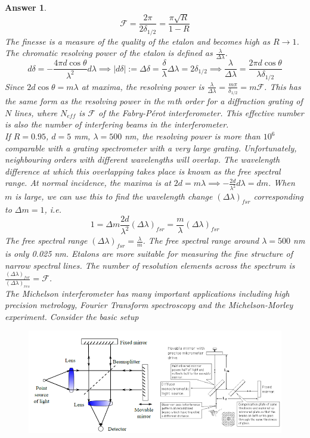 \documentclass[a4paper]{article}
\newtheorem{ans}{Answer}[subsection]
\theoremstyle{new}
\begin{document}
\begin{ans}
$$\mathcal{F}=\frac{2\pi}{2\delta_{1/2}}=\frac{\pi\sqrt{R}}{1-R}$$
The finesse is a measure of the quality of the etalon and becomes high as $R\rightarrow 1$. The chromatic resolving power of the etalon is defined as $\frac{\lambda}{\Delta\lambda}$.
$$d\delta=-\frac{4\pi d\cos\theta}{\lambda^2}d\lambda\implies|d\delta|:=\Delta\delta=\frac{\delta}{\lambda}\Delta\lambda=2\delta_{1/2}\implies\frac{\lambda}{\Delta\lambda}=\frac{2\pi d\cos\theta}{\lambda\delta_{1/2}}$$
Since $2d\cos\theta=m\lambda$ at maxima, the resolving power is $\frac{\lambda}{\Delta\lambda}=\frac{m\pi}{\delta_{1/2}}=m\mathcal{F}$. This has the same form as the resolving power in the $m$th order for a diffraction grating of $N$ lines, where $N_{eff}$ is $\mathcal{F}$ of the Fabry-Pérot interferometer. This effective number is also the number of interfering beams in the interferometer.\\[5pt]
If $R=0.95$, $d=5$ mm, $\lambda=500$ nm, the resolving power is more than $10^6$ comparable with a grating spectrometer with a very large grating. Unfortunately, neighbouring orders with different wavelengths will overlap. The wavelength difference at which this  overlapping takes place is known as the free spectral range. At normal incidence, the maxima is at $2d=m\lambda\implies-\frac{2d}{\lambda^2}d\lambda=dm$. When $m$ is large, we can use this to find the wavelength change $(\Delta\lambda)_{fsr}$ corresponding to $\Delta m=1$, i.e.
$$1=\Delta m\frac{2d}{\lambda^2}(\Delta\lambda)_{fsr}=\frac{m}{\lambda}(\Delta\lambda)_{fsr}$$
The free spectral range $(\Delta\lambda)_{fsr}=\frac{\lambda}{m}$. The free spectral range around $\lambda=500$ nm is only 0.025 nm. Etalons are more suitable for measuring the fine structure of narrow spectral lines. The number of resolution elements across the spectrum is $\frac{(\Delta\lambda)_{fsr}}{(\Delta\lambda)_{res}}=\mathcal{F}$.\\[5pt]
The Michelson interferometer has many important applications including high precision metrology, Fourier Transform spectroscopy and the Michelson-Morley experiment. Consider the basic setup
\begin{figure}[H]
    \centering
    \includegraphics[width=\linewidth]{mmi.PNG}

\end{figure}
\end{ans}
\end{document}
